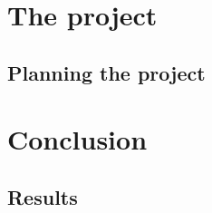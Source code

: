 \documentclass[UKenglish]{ifimaster}  %
\begin{document}
\part{The project}                    %

\chapter{Planning the project}        %


\part{Conclusion}                     %

\chapter{Results}                     %


\backmatter{}
\printbibliography
\end{document}

